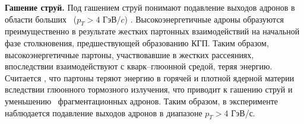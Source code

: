 \begin{comment}
	\begin{figure}[] 
		\center
		\includegraphics [width = 0.5\linewidth] {Intro/Strangeness_enhancement.png}
		\caption{Механизм образования странных кварков, основанный на модели термальной КХД.}
		\label{img:StrangenessEnhancement}  
	\end{figure}
\end{comment}
\begin{comment}
	\textbf{Динамика столкновения и уравнение состояния}
	Ожидается, что изучение коллективного движения образовавшихся адронов в конечном состоянии даст информацию о динамике столкновений тяжелых ионов. С гидродинамической точки зрения на столкновения,
	коллективное движение определяется градиентом давления сжатой ядерной материи на ранней стадии столкновения. В случае фазового перехода от порядковой ядерной к кварк-глюонной плазме ожидается соответствующее смягчение уравнения состояния за счет увеличения числа степеней свободы [4]. Таким образом, наблюдение за коллективным движением крайне важно для подтверждения гидродинамического описания динамики. Если фазовый переход первого рода, то уравнение состояния будет наиболее «мягким» при критической температуре Tc. Ожидается, что такое смягчение повлияет на динамическую эволюцию системы, поскольку внутреннее давление падает при Tc. Таким образом, наблюдение за функцией возбуждения поперечного коллективного потока может служить зондом для формирования КГП; падение функции возбуждения коллективного потока свидетельствует о пороговой энергии образования КГП.
\end{comment}

\textbf{Гашение струй.} 
Под гашением струй понимают подавление выходов адронов в области больших \pt \ ($p_T>4$ ГэВ/$c$) \cite{jet_quenching}. Высокоэнергетичные адроны образуются преимущественно в результате жестких партонных взаимодействий на начальной фазе столкновения, предшествующей образованию КГП. Таким образом, высокоэнергетичные партоны, участвовавшие в жестких рассеяниях, впоследствии взаимодействуют с кварк–глюонной средой, теряя энергию. Считается \cite{jet_quenching,InitialEnergyLoss}, что партоны теряют энергию в горячей и плотной ядерной материи вследствии глюонного тормозного излучения, что приводит к гашению струй и уменьшению \pt \ фрагментационных адронов.  Таким образом, в эксперименте наблюдается подавление выходов адронов в диапазоне $p_T > $4 ГэВ/с. 

